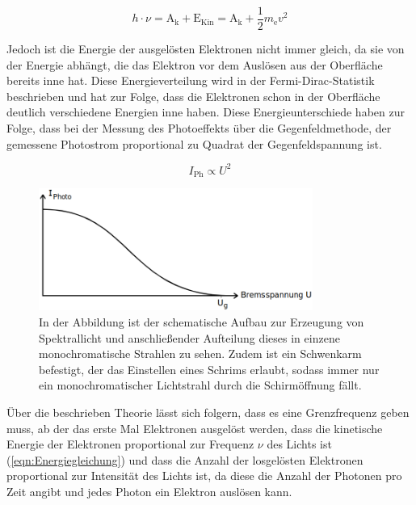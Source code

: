 \documentclass[titlepage = firstcover]{scrartcl}
\begin{document}
        \begin{equation}
            h \cdot \nu = \text{A}_{\text{k}} + \text{E}_{\text{Kin}} = \text{A}_{\text{k}} + \frac{1}{2} m_{\text{e}}v^2
            \label{eqn:Energiegleichung}
        \end{equation}

        \noindent
        Jedoch ist die Energie der ausgelösten Elektronen nicht immer gleich, da sie von der Energie abhängt, die das Elektron vor dem Auslösen aus der Oberfläche bereits inne hat. Diese 
        Energieverteilung wird in der Fermi-Dirac-Statistik beschrieben und hat zur Folge, dass die Elektronen schon in der Oberfläche deutlich verschiedene Energien inne haben. Diese 
        Energieunterschiede haben zur Folge, dass bei der Messung des Photoeffekts über die Gegenfeldmethode, der gemessene Photostrom proportional zu Quadrat der Gegenfeldspannung ist. 

        \begin{equation*}
            I_{\text{Ph}} \propto U^2
        \end{equation*}

        \FloatBarrier

                \begin{figure}[h]
                  \centering
                  \includegraphics[width = 0.8\textwidth]{Bilder/IUTheorie.png}
                  \caption{In der Abbildung ist der schematische Aufbau zur Erzeugung von Spektrallicht und anschließender Aufteilung dieses in einzene monochromatische Strahlen zu sehen. Zudem ist ein Schwenkarm befestigt, der das Einstellen eines Schrims erlaubt, sodass immer nur ein monochromatischer Lichtstrahl durch die Schirmöffnung fällt.}
                  \label{fig:IUTheorie}
                \end{figure}

        \FloatBarrier

        \noindent
        Über die beschrieben Theorie lässt sich folgern, dass es eine Grenzfrequenz geben muss, ab der das erste Mal Elektronen ausgelöst werden, dass die kinetische Energie der Elektronen
        proportional zur Frequenz $\nu$ des Lichts ist (\ref{eqn:Energiegleichung}) und dass die Anzahl der losgelösten Elektronen proportional zur Intensität des Lichts ist, da diese die Anzahl der 
        Photonen pro Zeit angibt und jedes Photon ein Elektron auslösen kann.
\end{document}
